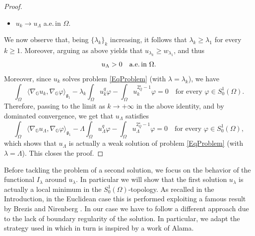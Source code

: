\documentclass[11pt]{amsart}
\numberwithin{equation}{section} %
\theoremstyle{definition}
\begin{document}
\begin{proof}
\begin{itemize}
		in $L^p(\Omega)$ for $1\leq p <2^{\star}_{Q}$;
		\item[b)] $u_k\to u_{\Lambda}$ a.e.\,in $\Omega$.
	\end{itemize}
	We now observe that, being $\{\lambda_k\}_k$ increasing, it follows that $\lambda_k\geq \lambda_1$ for every $k\geq 1$.
	Moreover, arguing as above yields that
	$u_{\lambda_k}\geq w_{\lambda_1}$, and thus
	$$u_{\Lambda} > 0\quad\text{a.e.\,in $\Omega$}.$$
	Moreover, since $u_k$ solves problem \eqref{EqProblem} (with $\lambda = \lambda_k$),
	we have
	$$\int_{\Omega}\langle \nabla_{\mathbb{G}}u_k,\nabla_{\mathbb{G}}\varphi\rangle_{\mathfrak{g}_{1}} -\lambda_k\int_\Omega u_k^{q}\varphi 
	-\int_\Omega u_k^{2^{\star}_{Q}-1}\varphi = 0\quad\text{for every $\varphi\in S^{1}_{0}(\Omega)$}.$$
Therefore, passing to the limit as $k\to+\infty$ in the above identity, and by dominated convergence, we get that $u_{\Lambda}$ satisfies
	$$\int_{\Omega}\langle \nabla_{\mathbb{G}}u_{\Lambda},\nabla_{\mathbb{G}}\varphi\rangle_{\mathfrak{g}_{1}} -\Lambda\int_\Omega u_{\Lambda}^{q}\varphi
	-\int_\Omega u_{\Lambda}^{2^{\star}_{Q}-1}\varphi = 0\quad\text{for every $\varphi\in S^{1}_{0}(\Omega)$},$$
	\noindent which shows that $u_{\Lambda}$ is actually a weak solution of
	problem \eqref{EqProblem} (with $\lambda = \Lambda$). 
%	
	This closes the proof.
\end{proof}

\medskip

Before tackling the problem of a second solution, we focus
on the behavior of the functional $I_\lambda$ around $u_\lambda$. In particular we will show that the first solution $u_{\lambda}$ is actually a local minimum in the $S_{0}^{1}(\Omega)$-topology. As recalled in the Introduction, in the Euclidean case this is performed exploiting a famous result by Brezis and Nirenberg \cite{BNH1C1}. In our case we have to follow a different approach due to the lack of boundary regularity of the solution. In particular, we adapt the strategy used in \cite{AbDiVa} which in turn is inspired by a work of Alama.
\end{document}
